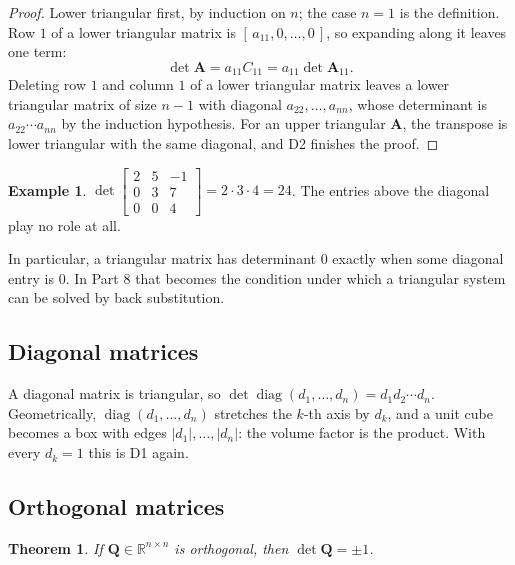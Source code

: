 \documentclass[11pt]{article}
\theoremstyle{plain}
\newtheorem{thm}{Theorem}[section]
\theoremstyle{definition}
\newtheorem{ex}{Example}[section]
\theoremstyle{remark}
\newcommand{\R}{\mathbb{R}}
\newcommand{\mt}[1]{\mathbf{#1}}
\DeclareMathOperator{\diagop}{diag}
\begin{document}
\begin{proof}
Lower triangular first, by induction on $n$; the case $n=1$ is the definition.
Row $1$ of a lower triangular matrix is $[\,a_{11},0,\dots,0\,]$, so expanding
along it leaves one term:
\[
  \det\mt{A}=a_{11}C_{11}=a_{11}\det\mt{A}_{11}.
\]
Deleting row $1$ and column $1$ of a lower triangular matrix leaves a lower
triangular matrix of size $n-1$ with diagonal $a_{22},\dots,a_{nn}$, whose
determinant is $a_{22}\cdots a_{nn}$ by the induction hypothesis. For an upper
triangular $\mt{A}$, the transpose is lower triangular with the same diagonal, and
D2 finishes the proof.
\end{proof}

\begin{ex}
$\det\begin{bmatrix}2&5&-1\\0&3&7\\0&0&4\end{bmatrix}=2\cdot3\cdot4=24$. The entries
above the diagonal play no role at all.
\end{ex}

\noindent In particular, a triangular matrix has determinant $0$ exactly when
some diagonal entry is $0$. In Part 8 that becomes the condition under which a
triangular system can be solved by back substitution.

\subsection{Diagonal matrices}
A diagonal matrix is triangular, so $\det\diagop(d_1,\dots,d_n)=d_1d_2\cdots d_n$.
Geometrically, $\diagop(d_1,\dots,d_n)$ stretches the $k$-th axis by $d_k$, and a
unit cube becomes a box with edges $|d_1|,\dots,|d_n|$: the volume factor is the
product. With every $d_k=1$ this is D1 again.

\subsection{Orthogonal matrices}
\begin{thm}
If $\mt{Q}\in\R^{n\times n}$ is orthogonal, then $\det\mt{Q}=\pm1$.
\end{thm}
\end{document}
